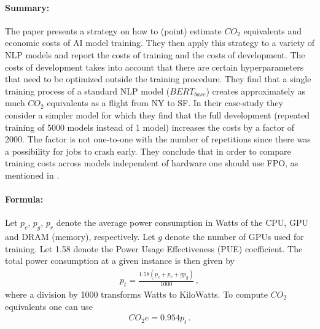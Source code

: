 \documentclass[a4paper, 12pt]{article}
\begin{document}
\paragraph{Summary:} The paper presents a strategy on how to (point) estimate $CO_2$
equivalents and economic costs of AI model training. They then apply this strategy to a
variety of NLP models and report the costs of training and the costs of development. The
costs of development takes into account that there are certain hyperparameters that need
to be optimized outside the training procedure. They find that a single training process
of a standard NLP model ($BERT_{base}$) creates approximately as much $CO_2$ equivalents
as a flight from NY to SF. In their case-study they consider a simpler model for which
they find that the full development (repeated training of 5000 models instead of 1
model) increases the costs by a factor of 2000. The factor is not one-to-one with the
number of repetitions since there was a possibility for jobs to crash early. They
conclude that in order to compare training costs across models independent of hardware
one should use FPO, as mentioned in .

\paragraph{Formula:} Let $p_c$, $p_g$, $p_r$ denote the average power consumption in
Watts of the CPU, GPU and DRAM (memory), respectively. Let $g$ denote the number of GPUs
used for training. Let 1.58 denote the Power Usage Effectiveness (PUE) coefficient. The
total power consumption at a given instance is then given by
\begin{align}
    p_t = \frac{1.58 (p_c + p_r + g p_g)}{1000} \,,
\end{align}
where a division by 1000 transforms Watts to KiloWatts. To compute $CO_2$ equivalents
one can use
\begin{align}
    CO_2e = 0.954 p_t \,.
\end{align}


\nocite{*}
\printbibliography[heading=bibintoc, title={Bibliography}]
\end{document}
